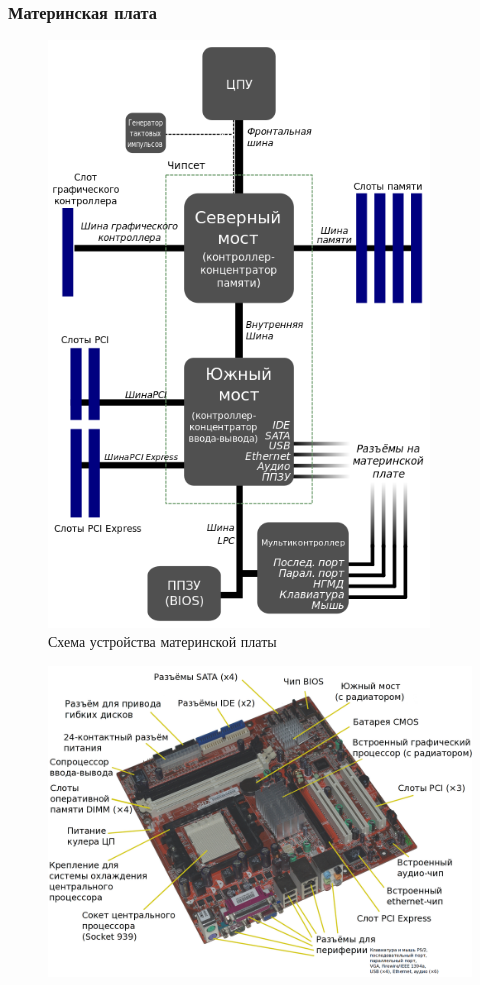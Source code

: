 \subsubsection{Материнская плата}\label{base:introduction:components:motherboard}
\begin{figure}[h!]
 \centering
 \includegraphics[width=0.9\textwidth]{base/Introduction/Motherboard_diagram.png}
 \caption{Схема устройства материнской платы}
 \label{base:introduction:components:motherboard:diagrampic}
\end{figure}
\begin{figure}
 \centering
 \includegraphics[width=\textwidth]{base/Introduction/Motherboard.png}
 \label{base:introduction:components:motherboard:motherboardpic}
\end{figure}
